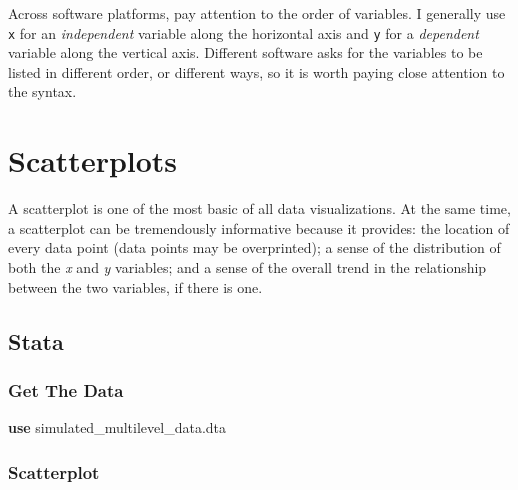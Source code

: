 \documentclass[
  letterpaper,
  DIV=11,
  numbers=noendperiod]{scrreprt}
\newenvironment{Shaded}{\begin{snugshade}}{\end{snugshade}}
\newcommand{\KeywordTok}[1]{\textcolor[rgb]{0.00,0.23,0.31}{\textbf{#1}}}
\newcommand{\NormalTok}[1]{\textcolor[rgb]{0.00,0.23,0.31}{#1}}
\begin{document}
\begin{tcolorbox}[enhanced jigsaw, colback=white, left=2mm, toprule=.15mm, arc=.35mm, colbacktitle=quarto-callout-caution-color!10!white, title=\textcolor{quarto-callout-caution-color}{\faFire}\hspace{0.5em}{Order of Variables}, bottomtitle=1mm, opacitybacktitle=0.6, bottomrule=.15mm, breakable, leftrule=.75mm, colframe=quarto-callout-caution-color-frame, toptitle=1mm, titlerule=0mm, coltitle=black, opacityback=0, rightrule=.15mm]

Across software platforms, pay attention to the order of variables. I
generally use \texttt{x} for an \emph{independent} variable along the
horizontal axis and \texttt{y} for a \emph{dependent} variable along the
vertical axis. Different software asks for the variables to be listed in
different order, or different ways, so it is worth paying close
attention to the syntax.

\end{tcolorbox}

\section{Scatterplots}\label{scatterplots}

A scatterplot is one of the most basic of all data visualizations. At
the same time, a scatterplot can be tremendously informative because it
provides: the location of every data point (data points may be
overprinted); a sense of the distribution of both the \emph{x} and
\emph{y} variables; and a sense of the overall trend in the relationship
between the two variables, if there is one.

\subsection{Stata}

\subsubsection{Get The Data}\label{get-the-data}

\begin{Shaded}
\begin{Highlighting}[]

\KeywordTok{use}\NormalTok{ simulated\_multilevel\_data.dta}
\end{Highlighting}
\end{Shaded}

\subsubsection{Scatterplot}\label{scatterplot}
\end{document}
